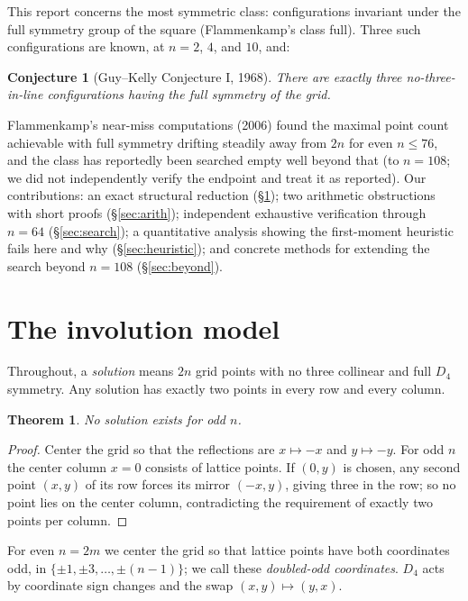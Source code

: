 \documentclass[11pt]{article}
\newtheorem{theorem}{Theorem}
\newtheorem{conjecture}{Conjecture}
\theoremstyle{remark}
\begin{document}
This report concerns the most symmetric class:
configurations invariant under the full symmetry group of the square
(Flammenkamp's class \textsf{full}).
Three such configurations are known, at $n=2$, $4$, and $10$, and:

\begin{conjecture}[Guy--Kelly Conjecture I, 1968]
There are exactly three no-three-in-line configurations having the full
symmetry of the grid.
\end{conjecture}

Flammenkamp's near-miss computations (2006) found the maximal point count
achievable with full symmetry drifting steadily away from $2n$ for even
$n\le 76$,
and the class has reportedly been searched empty well beyond that
(to $n=108$; we did not independently verify the endpoint and treat it as
reported).
Our contributions:
an exact structural reduction (\S\ref{sec:model});
two arithmetic obstructions with short proofs (\S\ref{sec:arith});
independent exhaustive verification through $n=64$ (\S\ref{sec:search});
a quantitative analysis showing the first-moment heuristic fails here and
why (\S\ref{sec:heuristic});
and concrete methods for extending the search beyond $n=108$
(\S\ref{sec:beyond}).

\section{The involution model}\label{sec:model}

Throughout, a \emph{solution} means $2n$ grid points with no three collinear
and full $D_4$ symmetry.
Any solution has exactly two points in every row and every column.

\begin{theorem}\label{thm:even}
No solution exists for odd $n$.
\end{theorem}

\begin{proof}
Center the grid so that the reflections are $x\mapsto -x$ and
$y\mapsto -y$.
For odd $n$ the center column $x=0$ consists of lattice points.
If $(0,y)$ is chosen, any second point $(x,y)$ of its row forces its mirror
$(-x,y)$, giving three in the row;
so no point lies on the center column,
contradicting the requirement of exactly two points per column.
\end{proof}

For even $n=2m$ we center the grid so that lattice points have both
coordinates odd, in $\{\pm1,\pm3,\dots,\pm(n-1)\}$;
we call these \emph{doubled-odd coordinates}.
$D_4$ acts by coordinate sign changes and the swap $(x,y)\mapsto(y,x)$.
\end{document}
